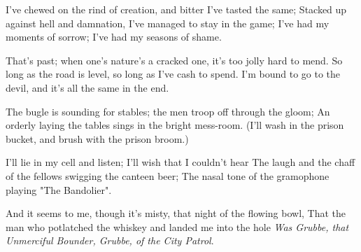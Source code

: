 \begin{poemblock}
 I've chewed on the rind of creation, and bitter I've tasted the same;
 Stacked up against hell and damnation, I've managed to stay in the game;
 I've had my moments of sorrow; I've had my seasons of shame.

 That's past; when one's nature's a cracked one,
   it's too jolly hard to mend.
 So long as the road is level, so long as I've cash to spend.
 I'm bound to go to the devil, and it's all the same in the end.

 The bugle is sounding for stables; the men troop off through the gloom;
 An orderly laying the tables sings in the bright mess-room.
 (I'll wash in the prison bucket, and brush with the prison broom.)

 I'll lie in my cell and listen; I'll wish that I couldn't hear
 The laugh and the chaff of the fellows swigging the canteen beer;
 The nasal tone of the gramophone playing "The Bandolier".

 And it seems to me, though it's misty, that night of the flowing bowl,
 That the man who potlatched the whiskey and landed me into the hole
 \textit{Was Grubbe, that Unmerciful Bounder, Grubbe, of the City Patrol}.

\end{poemblock}
